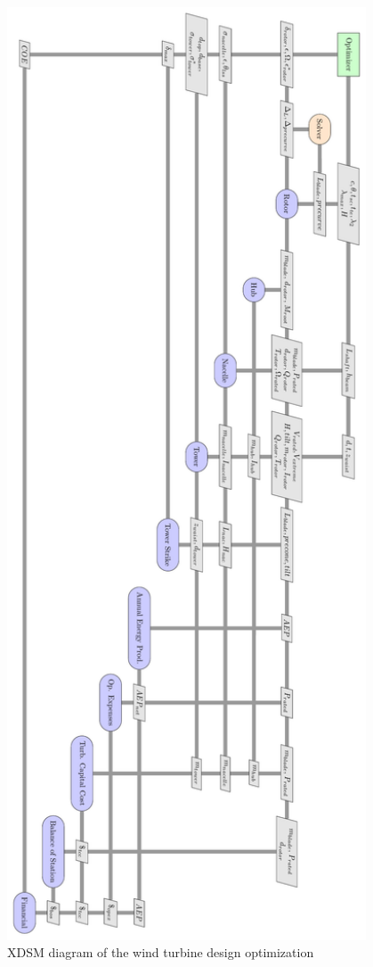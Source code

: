 \documentclass[]{aiaa-tc} %
\begin{document}
    \begin{figure}[!htbp]
        \centering
        \includegraphics[width=0.95\textwidth]{xdsm/wt_xdsm}
        \caption{XDSM diagram of the wind turbine design optimization}
        \label{fig:xdsm_wt}
    \end{figure}
\end{document}
